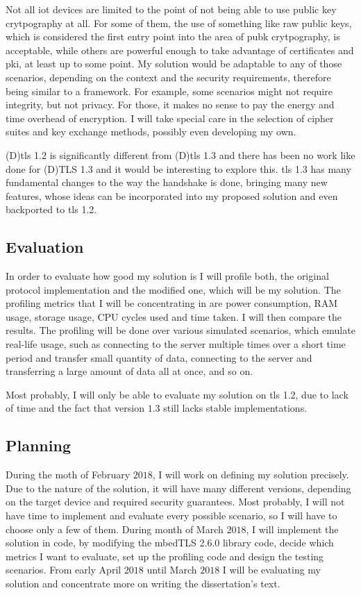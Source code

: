 \documentclass{llncs}
\begin{document}
Not all \gls{iot} devices are limited to the point of not being able to use
public key crytpography at all. For some of them, the use of something like raw
public keys, which is considered the first entry point into the area of \gls{pubk}
crytpography, is acceptable, while others are powerful enough to take
advantage of certificates and \gls{pki}, at least up to some point. My solution
would be adaptable to any of those scenarios, depending on the context and the security
requirements, therefore being similar to a framework. For example, some scenarios
might not require integrity, but not privacy. For those, it makes no sense to
pay the energy and time overhead of encryption. I will take special care in the
selection of cipher suites and key exchange methods, possibly even developing my own.

(D)\gls{tls} 1.2 is significantly different from (D)\gls{tls} 1.3
and there has been no work like \cite{RFC7924} done for (D)TLS 1.3
and it would be interesting to explore this. \gls{tls} 1.3 has many fundamental changes
to the way the handshake is done, bringing many new features, whose ideas can
be incorporated into my proposed solution and even backported to \gls{tls} 1.2.

\subsection{Evaluation}

In order to evaluate how good my solution is I will profile both, the original protocol
implementation and the modified one, which will be my solution. The profiling metrics
that I will be concentrating in are power consumption, RAM usage, storage usage,
CPU cycles used and time taken. I will then compare the results. The profiling
will be done over various simulated scenarios, which emulate real-life usage,
such as connecting to the server multiple times over a short time period and transfer
small quantity of data, connecting to the server and transferring a large
amount of data all at once, and so on.

Most probably, I will only be able to evaluate my solution on \gls{tls} 1.2,
due to lack of time and the fact that version $1.3$ still lacks stable implementations.


\subsection{Planning}

During the moth of February $2018$, I will work on defining my solution precisely.
Due to the nature of the solution, it will have many different versions, depending
on the target device and required security guarantees. Most probably, I will not
have time to implement and evaluate every possible scenario, so I will have to choose
only a few of them.
During month of March $2018$, I will implement the solution in code, by modifying
the mbedTLS 2.6.0 library\cite{SSLLibra13:online} code, decide which metrics
I want to evaluate, set up the profiling code and design the testing scenarios.
From early April $2018$ until March $2018$ I will be evaluating my solution and
concentrate more on writing the dissertation's text.
\end{document}
